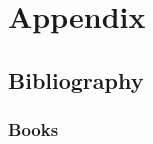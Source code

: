 \documentclass[11pt,fleqn]{book} %
\begin{document}





\part{Appendix}









\chapter*{Bibliography}
\section*{Books}
\printbibliography[heading=bibempty,type=book]
\end{document}
